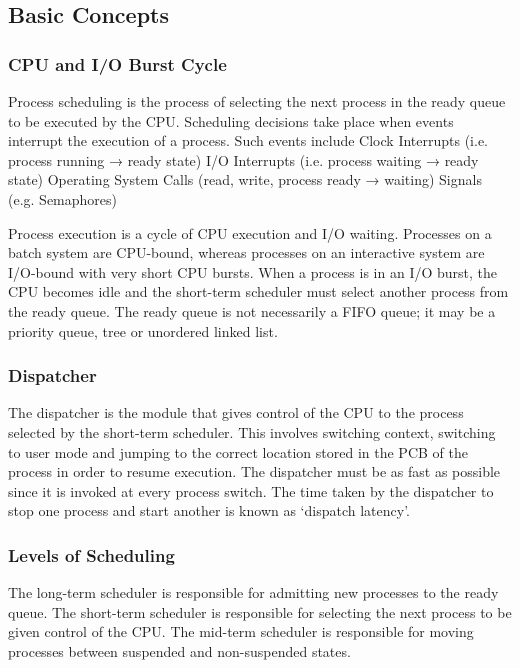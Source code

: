\subsection{Basic Concepts}

\subsubsection{CPU and I/O Burst Cycle}

Process scheduling is the process of selecting the next process in the ready queue to be executed by the CPU\@.
Scheduling decisions take place when events interrupt the execution of a process.
Such events include 
Clock Interrupts (i.e. process running → ready state)
I/O Interrupts (i.e. process waiting → ready state)
Operating System Calls (read, write, process ready → waiting)
Signals (e.g. Semaphores)

Process execution is a cycle of CPU execution and I/O waiting.
Processes on a batch system are CPU-bound, whereas processes on an interactive system are I/O-bound with very short CPU bursts.
When a process is in an I/O burst, the CPU becomes idle and the short-term scheduler must select another process from the ready queue.
The ready queue is not necessarily a FIFO queue; it may be a priority queue, tree or unordered linked list.

\subsubsection{Dispatcher}

The dispatcher is the module that gives control of the CPU to the process selected by the short-term scheduler.
This involves switching context, switching to user mode and jumping to the correct location stored in the PCB of the process in order to resume execution.
The dispatcher must be as fast as possible since it is invoked at every process switch.
The time taken by the dispatcher to stop one process and start another is known as `dispatch latency'.

\subsubsection{Levels of Scheduling}

The long-term scheduler is responsible for admitting new processes to the ready queue.
The short-term scheduler is responsible for selecting the next process to be given control of the CPU\@.
The mid-term scheduler is responsible for moving processes between suspended and non-suspended states.

